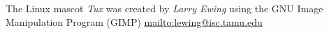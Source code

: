 %
The Linux mascot \textit{Tux} was created by \textit{Larry Ewing} 
using the GNU Image Manipulation Program (GIMP)
\url{mailto:lewing@isc.tamu.edu}
